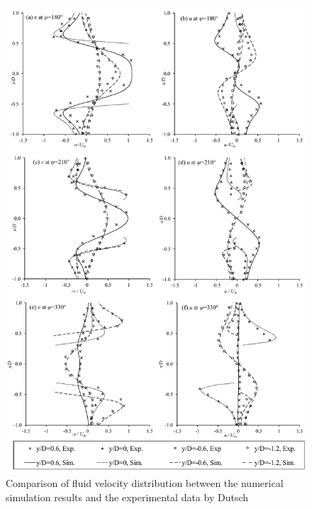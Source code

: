 \begin{figure}[tbp]
	\centering
	\captionsetup{justification=centering}
	\includegraphics[height=\textheight]{Figs/validation}
	\caption{Comparison of fluid velocity distribution between the numerical simulation results and the experimental data by Dutsch \cite{DUTSCH1998}}
	\label{fig:validation}
	\captionsetup{justification=centering}
\end{figure}


 \graphicspath{{Figs/}}



\clearpage

